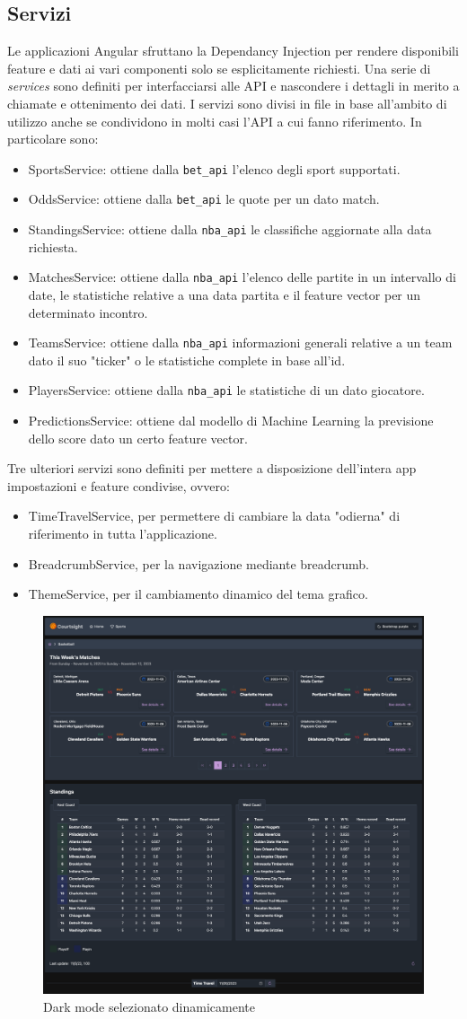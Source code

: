 \subsection{Servizi}
Le applicazioni Angular sfruttano la Dependancy Injection per rendere disponibili feature e dati ai vari componenti solo se esplicitamente richiesti. Una serie di \textit{services} sono definiti per interfacciarsi alle API e nascondere i dettagli in merito a chiamate e ottenimento dei dati.
I servizi sono divisi in file in base all'ambito di utilizzo anche se condividono in molti casi l'API a cui fanno riferimento. In particolare sono:
\begin{itemize}
    \item SportsService: ottiene dalla \texttt{bet\_api} l'elenco degli sport supportati.
    \item OddsService: ottiene dalla \texttt{bet\_api} le quote per un dato match.
    \item StandingsService: ottiene dalla \texttt{nba\_api} le classifiche aggiornate alla data richiesta.
    \item MatchesService: ottiene dalla \texttt{nba\_api} l'elenco delle partite in un intervallo di date, le statistiche relative a una data partita e il feature vector per un determinato incontro.
    \item TeamsService: ottiene dalla \texttt{nba\_api} informazioni generali relative a un team dato il suo "ticker" o le statistiche complete in base all'id.
    \item PlayersService: ottiene dalla \texttt{nba\_api} le statistiche di un dato giocatore.
    \item PredictionsService: ottiene dal modello di Machine Learning la previsione dello score dato un certo feature vector.
\end{itemize}
Tre ulteriori servizi sono definiti per mettere a disposizione dell'intera app impostazioni e feature condivise, ovvero:
\begin{itemize}
    \item TimeTravelService, per permettere di cambiare la data "odierna" di riferimento in tutta l'applicazione.
    \item BreadcrumbService, per la navigazione mediante breadcrumb.
    \item ThemeService, per il cambiamento dinamico del tema grafico.
\end{itemize}
\begin{figure}[H]
    \centering
    \includegraphics[width=0.75\linewidth]{img/webapp/themes.png}
    \caption{Dark mode selezionato dinamicamente}
    \label{fig:enter-label}
\end{figure}
\newpage
